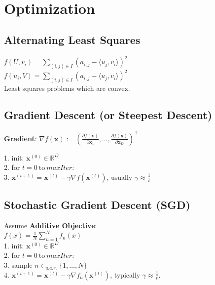 \section{Optimization}

\subsection*{Alternating Least Squares}
$f(U,v_i)=\sum_{(i,j)\in I} (a_{i,j} - \langle u_j, v_i \rangle)^2$\\
$f(u_i,V)=\sum_{(i,j)\in I} (a_{i,j} - \langle u_j, v_i \rangle)^2$\\
Least squares problems which are convex.



\subsection*{Gradient Descent (or Steepest Descent)}
\textbf{Gradient}: $\nabla f(\mathbf{x}) := \left( \frac{\partial f(\mathbf{x})}{\partial \mathbf{x}_1}, \ldots, \frac{\partial f(\mathbf{x})}{\partial \mathbf{x}_D} \right)^\top$

1. init: $\mathbf{x}^{(0)} \in \mathbb{R}^D$\\
2. for $t = 0 \ \text{to} \ \mathit{maxIter}$:\\
3. $\mathbf{x}^{(t+1)} = \mathbf{x}^{(t)} - \gamma \nabla f(\mathbf{x}^{(t)})$, usually $\gamma \approx \frac{1}{t}$

\subsection*{Stochastic Gradient Descent (SGD)}
Assume \textbf{Additive Objective}:\\
$f(x) = \frac{1}{N}\sum_{n=1}^{N}f_n(x)$\\
1. init: $\mathbf{x}^{(0)} \in \mathbb{R}^D$\\
2. for $t = 0 \ \text{to} \ \mathit{maxIter}$:\\
3. sample $n \in_{u.a.r.} \{1, \ldots, N\}$\\
4. $\mathbf{x}^{(t+1)} = \mathbf{x}^{(t)} - \gamma \nabla f_n(\mathbf{x}^{(t)})$, typically  $\gamma \approx \frac{1}{t}$.

